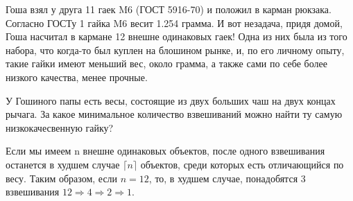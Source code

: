 
Гоша взял у друга 11 гаек M6 (ГОСТ 5916-70) и положил в карман рюкзака. Согласно ГОСТу 1  гайка M6 весит 1.254 грамма. И вот незадача, придя домой, Гоша насчитал в кармане 12  внешне одинаковых гаек! Одна из них была из того набора, что когда-то был куплен на блошином рынке, и, по его личному опыту, такие гайки имеют меньший вес, около грамма, а также сами по себе более низкого качества, менее прочные. 

У Гошиного папы есть весы, состоящие из двух больших чаш на двух концах рычага. За какое минимальное количество взвешиваний можно найти ту самую низкокачесвенную гайку?

\solutionSection

Если мы имеем n внешне одинаковых объектов, после одного взвешивания останется в худшем случае $\lceil n \rceil$ объектов, среди которых есть отличающийся по весу. Таким образом, если $n = 12$, то, в худшем случае, понадобятся 3 взвешивания $12\Rightarrow 4\Rightarrow 2\Rightarrow 1$.

